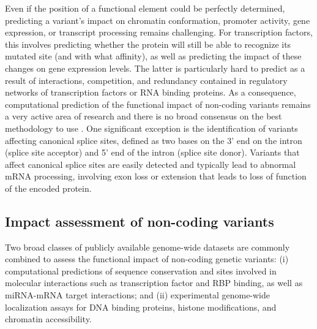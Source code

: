Even if the position of a functional element could be perfectly determined, predicting a variant’s impact on chromatin conformation, promoter activity, gene expression, or transcript processing remains challenging. For transcription factors, this involves predicting whether the protein will still be able to recognize its mutated site (and with what affinity), as well as predicting the impact of these changes on gene expression levels. The latter is particularly hard to predict as a result of interactions, competition, and redundancy contained in regulatory networks of transcription factors or RNA binding proteins. As a consequence, computational prediction of the functional impact of non-coding variants remains a very active area of research and there is no broad consensus on the best methodology to use \cite{ward2012interpreting}. One significant exception is the identification of variants affecting canonical splice sites, defined as two bases on the 3’ end on the intron (splice site acceptor) and 5’ end of the intron (splice site donor). Variants that affect canonical splice sites are easily detected and typically lead to abnormal mRNA processing, involving exon loss or extension that leads to loss of function of the encoded protein.

\subsection{Impact assessment of non-coding variants}

Two broad classes of publicly available genome-wide datasets are commonly combined to assess the functional impact of non-coding genetic variants: (i) computational predictions of sequence conservation and sites involved in molecular interactions such as transcription factor and RBP binding, as well as miRNA-mRNA target interactions; and (ii) experimental genome-wide localization assays for DNA binding proteins, histone modifications, and chromatin accessibility.


